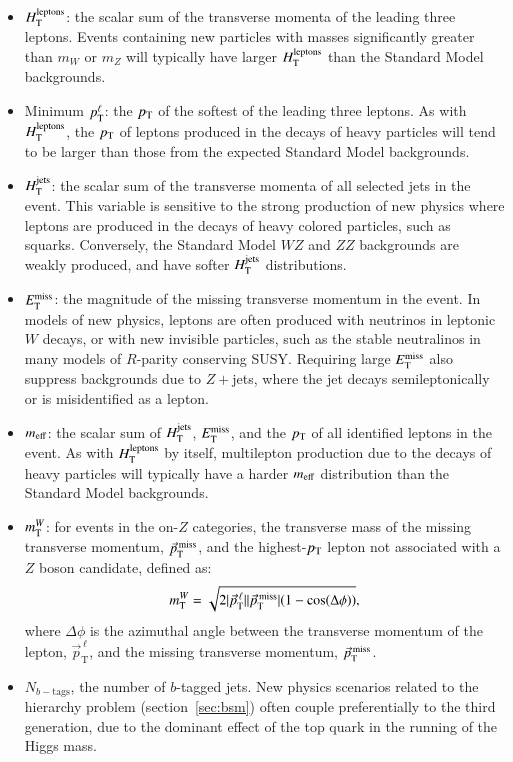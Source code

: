 \begin{itemize}
	\item $H_{\mathrm{T}}^{\mathrm{leptons}}$: the scalar sum of the transverse momenta of the leading three leptons. Events containing new particles with masses significantly greater than $m_W$ or $m_Z$ will typically have larger $H_{\mathrm{T}}^{\mathrm{leptons}}$ than the Standard Model backgrounds.
	\item Minimum $p_{\text{T}}^{\ell}$: the $p_{\text{T}}$ of the softest of the leading three leptons. As with $H_{\mathrm{T}}^{\mathrm{leptons}}$, the $p_{\text{T}}$ of leptons produced in the decays of heavy particles will tend to be larger than those from the expected Standard Model backgrounds.
	\item $H_{\mathrm{T}}^{\mathrm{jets}}$: the scalar sum of the transverse momenta of all selected jets in the event. This variable is sensitive to the strong production of new physics where leptons are produced in the decays of heavy colored particles, such as squarks. Conversely, the Standard Model $WZ$ and $ZZ$ backgrounds are weakly produced, and have softer $H_{\mathrm{T}}^{\mathrm{jets}}$ distributions.
	\item $E_{\text{T}}^{\text{miss}}$: the magnitude of the missing transverse momentum in the event. In models of new physics, leptons are often produced with neutrinos in leptonic $W$ decays, or with new invisible particles, such as the stable neutralinos in many models of $R$-parity conserving SUSY. Requiring large $E_{\text{T}}^{\text{miss}}$ also suppress backgrounds due to $Z+$jets, where the jet decays semileptonically or is misidentified as a lepton. 
	\item $m_{\mathrm{eff}}$: the scalar sum of $H_{\mathrm{T}}^{\mathrm{jets}}$, $E_{\text{T}}^{\text{miss}}$, and the $p_{\text{T}}$ of all identified leptons in the event. As with $H_{\mathrm{T}}^{\mathrm{leptons}}$ by itself, multilepton production due to the decays of heavy particles will typically have a harder $m_{\mathrm{eff}}$ distribution than the Standard Model backgrounds.
	\item $m_{\mathrm{T}}^W$: for events in the on-$Z$ categories, the transverse mass of the missing transverse momentum, $\vec{p}_{\mathrm{T}}^{\,\mathrm{miss}}$, and the highest-$p_{\text{T}}$ lepton not associated with a $Z$ boson candidate, defined as:
	\begin{equation}
		m_{\mathrm{T}}^W = \sqrt{2 |\vec{p}_{\mathrm{T}}^{\,\ell}||\vec{p}_{\mathrm{T}}^{\,\mathrm{miss}}|(1-\cos(\Delta\phi))},
	\end{equation}
	where $\Delta \phi$ is the azimuthal angle between the transverse momentum of the lepton, $\vec{p}_{\mathrm{T}}^{\,\ell}$, and the missing transverse momentum, $\vec{p}_{\mathrm{T}}^{\,\mathrm{miss}}$. 
	\item $N_{b-\mathrm{tags}}$, the number of $b$-tagged jets. New physics scenarios related to the hierarchy problem (section~\ref{sec:bsm}) often couple preferentially to the third generation, due to the dominant effect of the top quark in the running of the Higgs mass. 
\end{itemize}


